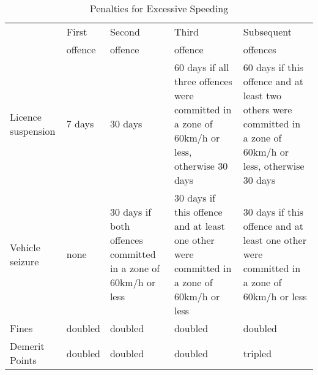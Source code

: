 
\begin{table}%
\centering
\begin{tabular}{p{1.5cm} p{1.5cm} p{2cm} p{2.5cm} p{2.5cm}}
  \hline
     				& First  	& Second	& Third 	& Subsequent  \\ 
				& offence	& offence	& offence 	& offences \\
  \hline
Licence suspension
	&  7 days
		& 30 days
			& 60 days if all three offences were committed in a zone of 60km/h or less, 
				otherwise 30 days
				& 60 days if this offence and at least two others were committed 
					in a zone of 60km/h or less, otherwise 30 days \\
   \hline
Vehicle seizure 
	& none
		& 30 days if both offences committed in a zone of 60km/h or less
			& 30 days if this offence and at least one other were committed 
				in a zone of 60km/h or less
				& 30 days if this offence and at least one other were committed 
					in a zone of 60km/h or less \\
   \hline
Fines			& doubled			& doubled			& doubled			& doubled \\
   \hline
Demerit Points	& doubled			& doubled			& doubled			& tripled \\
   \hline
\end{tabular}
\caption{Penalties for Excessive Speeding} 
\label{tab:penalties}
\end{table}